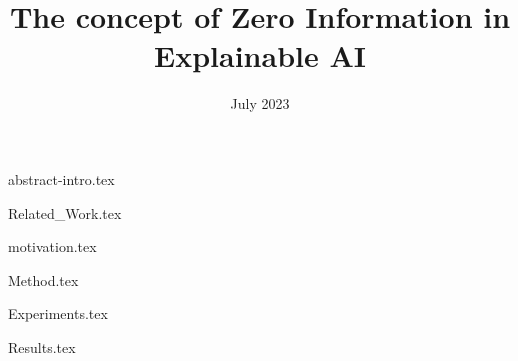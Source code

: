 \documentclass{article}
\title{The concept of Zero Information in Explainable AI}
\date{July 2023}
\begin{document}
\maketitle

\begin{multicols}{2}

{abstract-intro.tex}

{Related_Work.tex}

{motivation.tex}

{Method.tex}

{Experiments.tex}

{Results.tex}

\end{multicols}



\end{document}
